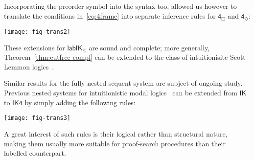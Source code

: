 \documentclass[twoside]{aiml20}
\newcommand*{\ax}[1]{\mathsf{#1}}
\newcommand*{\BOX}{\mathord{\Box}}
\newcommand*{\DIA}{\mathord{\Diamond}}
\newcommand*{\IK}{\mathsf{IK}}
\newcommand*{\lab}{\mathsf{lab}}
\newcommand*{\labIKp}{\lab\IK_{\le}}
\begin{document}
Incorporating the preorder symbol into the syntax too, allowed us however to 
translate the conditions in~\eqref{eq:4frame} into separate inference rules for $\ax{4_{\BOX}}$ and $\ax{4_{\DIA}}$:%
%
\begin{center}
	\texttt{[image: fig-trans2]}
\end{center}
%
These extensions for $\labIKp$ are sound and complete;
more generally, Theorem~\ref{thm:cutfree-compl} can be extended to the class of intuitionisitc Scott-Lemmon logics~\cite{marin:morales:strassburger:hal}. 

Similar results for the fully nested sequent system are subject of ongoing study. 
%
Previous nested systems for intuitionistic modal logics~\cite{strassburger2013,kuznets:strassburger:maehara} can be extended from $\IK$ to $\mathsf{IK4}$ by simply adding the following rules:%
%
\begin{center}
	\texttt{[image: fig-trans3]}
\end{center}
%
A great interest of such rules is their logical rather than structural nature, making them usually more suitable for proof-search procedures than their labelled counterpart.




%
%
\end{document}
